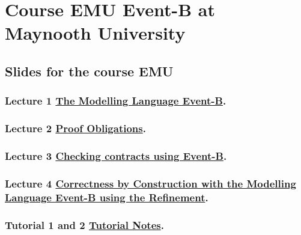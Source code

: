 \documentclass[ 12pt]{article}
\begin{document}
\section{Course  EMU  Event-B  at Maynooth University}
\label{sec:course-mcfsi-at}


\subsection{Slides for the course EMU}
\label{sec:slides}



\subsubsection{Lecture 1
  \href{http://mery54.github.io/teaching/mosos/lecturesnotes/mcfsi-maynooth-lect1.pdf}{The 
    Modelling Language Event-B}. 
}


\subsubsection{Lecture 2
    \href{http://mery54.github.io/teaching/mosos/lecturesnotes/mcfsi-maynooth-po.pdf}{Proof
      Obligations}.}


  
\subsubsection{Lecture 3
    \href{http://mery54.github.io/teaching/mosos/lecturesnotes/mcfsi-maynooth-verification.pdf}{Checking
      contracts using Event-B}.}

  

  \subsubsection{Lecture 4
    \href{http://mery54.github.io/teaching/mosos/lecturesnotes/mcfsi-maynooth-lect2.pdf}{Correctness by Construction with the  
      Modelling Language Event-B using the Refinement}.}
  \label{sec:lect-3-hrefhttp:m}

  \subsubsection{Tutorial  1 and 2
    \href{http://mery54.github.io/teaching/mosos/lecturesnotes/mcfsi-maynooth-tut.pdf}{Tutorial
      Notes}.}
\label{sec:tuthrefhttp:m}
\end{document}
